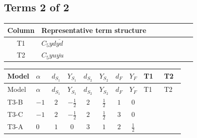 \documentclass[8pt]{article}
\begin{document}
\begin{landscape}
\subsection*{Terms 2 of 2}
\begin{center}
\begin{tabular}{@{}c >{\raggedright\arraybackslash}p{0.82\linewidth}@{}}
\toprule
Column & Representative term structure \\
\midrule
T1 & \(\displaystyle C_{5} yd \overline{yd}\) \\
\midrule
T2 & \(\displaystyle C_{5} yu \overline{yu}\) \\
\midrule
\bottomrule
\end{tabular}
\end{center}
\smallskip
\tiny
\begin{longtable}{@{}llcccccc >{\raggedright\arraybackslash}p{0.21\linewidth} >{\raggedright\arraybackslash}p{0.21\linewidth}@{}}
\toprule
Model & $\alpha$ & $d_{S_1}$ & $Y_{S_1}$ & $d_{S_2}$ & $Y_{S_2}$ & $d_F$ & $Y_F$ & T1 & T2 \\
\midrule
\endfirsthead
\toprule
Model & $\alpha$ & $d_{S_1}$ & $Y_{S_1}$ & $d_{S_2}$ & $Y_{S_2}$ & $d_F$ & $Y_F$ & T1 & T2 \\
\midrule
\endhead
T3-B & $-1$ & $2$ & $-\frac{1}{2}$ & $2$ & $\frac{1}{2}$ & $1$ & $0$ & \scriptsize\adjustbox{max width=\linewidth}{$\begin{gathered} 6 C_{5} yd \overline{yd}\end{gathered}$} & \scriptsize\adjustbox{max width=\linewidth}{$\begin{gathered} 6 C_{5} yu \overline{yu}\end{gathered}$} \\
\midrule
T3-C & $-1$ & $2$ & $-\frac{1}{2}$ & $2$ & $\frac{1}{2}$ & $3$ & $0$ & \scriptsize\adjustbox{max width=\linewidth}{$\begin{gathered} 6 C_{5} yd \overline{yd}\end{gathered}$} & \scriptsize\adjustbox{max width=\linewidth}{$\begin{gathered} 6 C_{5} yu \overline{yu}\end{gathered}$} \\
\midrule
T3-A & $0$ & $1$ & $0$ & $3$ & $1$ & $2$ & $\frac{1}{2}$ & \scriptsize\adjustbox{max width=\linewidth}{$\begin{gathered} 6 C_{5} yd \overline{yd}\end{gathered}$} & \scriptsize\adjustbox{max width=\linewidth}{$\begin{gathered} 6 C_{5} yu \overline{yu}\end{gathered}$} \\

\end{longtable}
\end{landscape}
\end{document}

